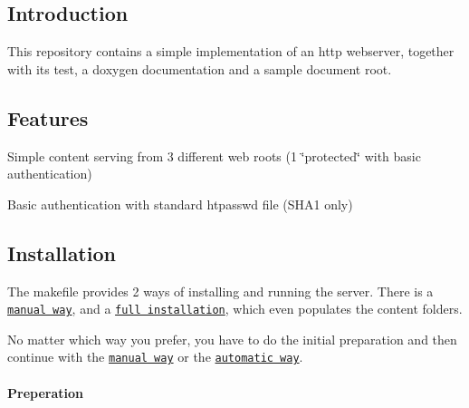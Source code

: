 \subsection*{Introduction}

This repository contains a simple implementation of an http webserver, together with its test, a doxygen documentation and a sample document root.

\subsection*{Features}


\begin{DoxyItemize}
\item Simple content serving from 3 different web roots (1 \char`\"{}protected\char`\"{} with basic authentication)
\item Basic authentication with standard htpasswd file (S\+H\+A1 only)
\end{DoxyItemize}

\subsection*{Installation}

The makefile provides 2 ways of installing and running the server. There is a \href{#manual-installation}{\tt manual way}, and a \href{#automatic-installation}{\tt full installation}, which even populates the content folders.

No matter which way you prefer, you have to do the initial preparation and then continue with the \href{#manual-installation}{\tt manual way} or the \href{#automatic-installation}{\tt automatic way}. 



\paragraph*{Preperation}


